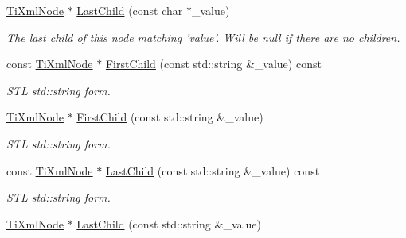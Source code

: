 \begin{DoxyCompactItemize}
\item 
\hypertarget{class_ti_xml_node_abad5bf1059c48127b958711ef89e8e5d}{
\hyperlink{class_ti_xml_node}{TiXmlNode} $\ast$ \hyperlink{class_ti_xml_node_abad5bf1059c48127b958711ef89e8e5d}{LastChild} (const char $\ast$\_\-value)}
\label{class_ti_xml_node_abad5bf1059c48127b958711ef89e8e5d}

\begin{DoxyCompactList}\small\item\em The last child of this node matching 'value'. Will be null if there are no children. \item\end{DoxyCompactList}\item 
\hypertarget{class_ti_xml_node_a07f6200a5956c723c5b52d70f29c46f6}{
const \hyperlink{class_ti_xml_node}{TiXmlNode} $\ast$ \hyperlink{class_ti_xml_node_a07f6200a5956c723c5b52d70f29c46f6}{FirstChild} (const std::string \&\_\-value) const }
\label{class_ti_xml_node_a07f6200a5956c723c5b52d70f29c46f6}

\begin{DoxyCompactList}\small\item\em STL std::string form. \item\end{DoxyCompactList}\item 
\hypertarget{class_ti_xml_node_a10d2669ccb5e29e02fcb0e4408685ef6}{
\hyperlink{class_ti_xml_node}{TiXmlNode} $\ast$ \hyperlink{class_ti_xml_node_a10d2669ccb5e29e02fcb0e4408685ef6}{FirstChild} (const std::string \&\_\-value)}
\label{class_ti_xml_node_a10d2669ccb5e29e02fcb0e4408685ef6}

\begin{DoxyCompactList}\small\item\em STL std::string form. \item\end{DoxyCompactList}\item 
\hypertarget{class_ti_xml_node_a256d0cdbfcfeccae83f3a1c9747a8b63}{
const \hyperlink{class_ti_xml_node}{TiXmlNode} $\ast$ \hyperlink{class_ti_xml_node_a256d0cdbfcfeccae83f3a1c9747a8b63}{LastChild} (const std::string \&\_\-value) const }
\label{class_ti_xml_node_a256d0cdbfcfeccae83f3a1c9747a8b63}

\begin{DoxyCompactList}\small\item\em STL std::string form. \item\end{DoxyCompactList}\item 
\hypertarget{class_ti_xml_node_a69772c9202f70553f940b15c06b07be3}{
\hyperlink{class_ti_xml_node}{TiXmlNode} $\ast$ \hyperlink{class_ti_xml_node_a69772c9202f70553f940b15c06b07be3}{LastChild} (const std::string \&\_\-value)}
\label{class_ti_xml_node_a69772c9202f70553f940b15c06b07be3}


\end{DoxyCompactItemize}
